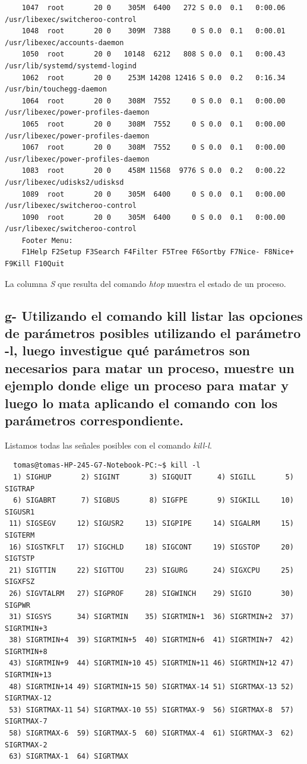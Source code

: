 \documentclass{article}
\begin{document}
\begin{commandline}
{\begin{verbatim}
    1047  root       20 0    305M  6400   272 S 0.0  0.1   0:00.06 /usr/libexec/switcheroo-control
    1048  root       20 0    309M  7388     0 S 0.0  0.1   0:00.01 /usr/libexec/accounts-daemon
    1050  root       20 0   10148  6212   808 S 0.0  0.1   0:00.43 /usr/lib/systemd/systemd-logind
    1062  root       20 0    253M 14208 12416 S 0.0  0.2   0:16.34 /usr/bin/touchegg-daemon
    1064  root       20 0    308M  7552     0 S 0.0  0.1   0:00.00 /usr/libexec/power-profiles-daemon
    1065  root       20 0    308M  7552     0 S 0.0  0.1   0:00.00 /usr/libexec/power-profiles-daemon
    1067  root       20 0    308M  7552     0 S 0.0  0.1   0:00.00 /usr/libexec/power-profiles-daemon
    1083  root       20 0    458M 11568  9776 S 0.0  0.2   0:00.22 /usr/libexec/udisks2/udisksd
    1089  root       20 0    305M  6400     0 S 0.0  0.1   0:00.00 /usr/libexec/switcheroo-control
    1090  root       20 0    305M  6400     0 S 0.0  0.1   0:00.00 /usr/libexec/switcheroo-control
    Footer Menu:
    F1Help F2Setup F3Search F4Filter F5Tree F6Sortby F7Nice- F8Nice+ F9Kill F10Quit
    \end{verbatim}
  }
\end{commandline}

\noindent
La columna \textit{S} que resulta del comando \textit{htop} muestra el estado de un proceso.  

\subsection*{g- Utilizando el comando kill listar las opciones de parámetros posibles utilizando el parámetro -l, luego
investigue qué parámetros son necesarios para matar un proceso, muestre un ejemplo donde elige
un proceso para matar y luego lo mata aplicando el comando con los parámetros correspondiente.}

\noindent
Listamos todas las señales posibles con el comando \textit{kill-l}.

\begin{commandline}
 {
\begin{verbatim}
  tomas@tomas-HP-245-G7-Notebook-PC:~$ kill -l
  1) SIGHUP       2) SIGINT       3) SIGQUIT      4) SIGILL       5) SIGTRAP 
  6) SIGABRT      7) SIGBUS       8) SIGFPE       9) SIGKILL     10) SIGUSR1
 11) SIGSEGV     12) SIGUSR2     13) SIGPIPE     14) SIGALRM     15) SIGTERM
 16) SIGSTKFLT   17) SIGCHLD     18) SIGCONT     19) SIGSTOP     20) SIGTSTP
 21) SIGTTIN     22) SIGTTOU     23) SIGURG      24) SIGXCPU     25) SIGXFSZ
 26) SIGVTALRM   27) SIGPROF     28) SIGWINCH    29) SIGIO       30) SIGPWR   
 31) SIGSYS      34) SIGRTMIN    35) SIGRTMIN+1  36) SIGRTMIN+2  37) SIGRTMIN+3 
 38) SIGRTMIN+4  39) SIGRTMIN+5  40) SIGRTMIN+6  41) SIGRTMIN+7  42) SIGRTMIN+8 
 43) SIGRTMIN+9  44) SIGRTMIN+10 45) SIGRTMIN+11 46) SIGRTMIN+12 47) SIGRTMIN+13 
 48) SIGRTMIN+14 49) SIGRTMIN+15 50) SIGRTMAX-14 51) SIGRTMAX-13 52) SIGRTMAX-12 
 53) SIGRTMAX-11 54) SIGRTMAX-10 55) SIGRTMAX-9  56) SIGRTMAX-8  57) SIGRTMAX-7 
 58) SIGRTMAX-6  59) SIGRTMAX-5  60) SIGRTMAX-4  61) SIGRTMAX-3  62) SIGRTMAX-2 
 63) SIGRTMAX-1  64) SIGRTMAX
\end{verbatim}
}
\end{commandline}
\end{document}
